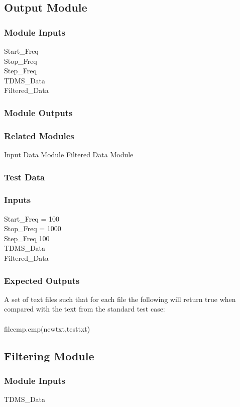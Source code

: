 \documentclass[12pt]{article}
\begin{document}
\subsection{Output Module}

\subsubsection{Module Inputs}
Start\_Freq\\
Stop\_Freq\\
Step\_Freq\\
TDMS\_Data\\
Filtered\_Data

\subsubsection{Module Outputs}

\subsubsection{Related Modules}
Input Data Module
Filtered Data Module
\subsubsection{Test Data}

\subsubsection{Inputs}
Start\_Freq = 100\\
Stop\_Freq = 1000\\
Step\_Freq 100\\
TDMS\_Data\\
Filtered\_Data
\subsubsection{Expected Outputs}
A set of text files such that for each file the following will return true
when compared with the text from the standard test case:\\\\
filecmp.cmp(newtxt,testtxt)


\subsection{Filtering Module}

\subsubsection{Module Inputs}
TDMS\_Data
\end{document}
